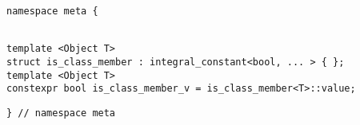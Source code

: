 
\begin{verbatim}
namespace meta {
\end{verbatim}
\begin{verbatim}

template <Object T>
struct is_class_member : integral_constant<bool, ... > { };
template <Object T>
constexpr bool is_class_member_v = is_class_member<T>::value;

\end{verbatim}
\begin{verbatim}
} // namespace meta
\end{verbatim}
